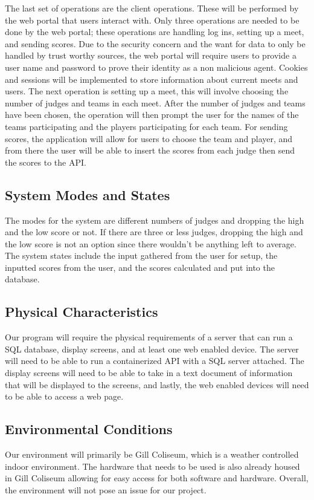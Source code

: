 \documentclass[letterpaper,10pt,draftclsnofoot,onecolumn,]{article}
\begin{document}
\noindent The last set of operations are the client operations. These will be performed by the web portal that users interact with. Only three operations are needed to be done by the web portal; these operations are handling log ins, setting up a meet, and sending scores. Due to the security concern and the want for data to only be handled by trust worthy sources, the web portal will require users to provide a user name and password to prove their identity as a non malicious agent. Cookies and sessions will be implemented to store information about current meets and users. The next operation is setting up a meet, this will involve choosing the number of judges and teams in each meet. After the number of judges and teams have been chosen, the operation will then prompt the user for the names of the teams participating and the players participating for each team. For sending scores, the application will allow for users to choose the team and player, and from there the user will be able to insert the scores from each judge then send the scores to the API.

\subsection{System Modes and States}
The modes for the system are different numbers of judges and dropping the high and the low score or not. If there are three or less judges, dropping the high and the low score is not an option since there wouldn't be anything left to average. The system states include the input gathered from the user for setup, the inputted scores from the user, and the scores calculated and put into the database.\\

\subsection{Physical Characteristics}
Our program will require the physical requirements of a server that can run a SQL database, display screens, and at least one web enabled device. The server will need to be able to run a containerized API with a SQL server attached. The display screens will need to be able to take in a text document of information that will be displayed to the screens, and lastly, the web enabled devices will need to be able to access a web page.

\subsection{Environmental Conditions}
Our environment will primarily be Gill Coliseum, which is a weather controlled indoor environment. The hardware that needs to be used is also already housed in Gill Coliseum allowing for easy access for both software and hardware. Overall, the environment will not pose an issue for our project.
\end{document}
